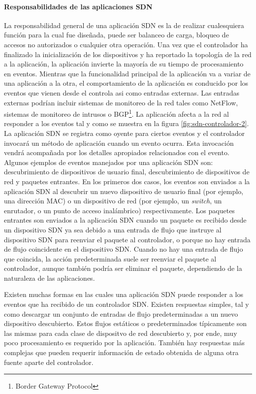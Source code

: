 \documentclass[10pt,journal,compsoc]{IEEEtran}
\begin{document}
\paragraph{Responsabilidades de las aplicaciones SDN}
La responsabilidad general de una aplicación SDN es la de realizar cualesquiera función para la cual fue diseñada, puede ser balanceo de carga, bloqueo de accesos no autorizados o cualquier otra operación. Una vez que el controlador ha finalizado la inicialización de los dispositivos y ha reportado la topología de la red a la aplicación, la aplicación invierte la mayoría de su tiempo de procesamiento en eventos. Mientras que la funcionalidad principal de la aplicación va a variar de una aplicación a la otra, el comportamiento de la aplicación es conducido por los eventos que vienen desde el controla asi como entradas externas. Las entradas externas podrían incluir sistemas de monitoreo de la red tales como NetFlow, sistemas de monitoreo de intrusos o BGP\footnote{Border Gateway Protocol}. La aplicación afecta a la red al responder a los eventos tal y como se muestra en la figura \ref{fig:sdn-controlador-2}. La aplicación SDN se registra como oyente para ciertos eventos y el controlador invocará un método de aplicación cuando un evento ocurra. Esta invocación vendrá acompañada por los detalles apropiados relacionados con el evento. Algunos ejemplos de eventos manejados por una aplicación SDN son: descubrimiento de dispositivos de usuario final, descubrimiento de dispositivos de red y paquetes entrantes. En los primeros dos casos, los eventos son enviados a la aplicación SDN al descubrir un nuevo dispositivo de usuario final (por ejemplo, una dirección MAC) o un dispositivo de red (por ejemplo, un \emph{switch}, un enrutador, o un punto de acceso inalámbrico) respectivamente. Los paquetes entrantes son enviados a la aplicación SDN cuando un paquete es recibido desde un dispositivo SDN ya sea debido a una entrada de flujo que instruye al dispositivo SDN para reenviar el paquete al controlador, o porque no hay entrada de flujo coincidente en el dispositivo SDN. Cuando no hay una entrada de flujo que coincida, la acción predeterminada suele ser reenviar el paquete al controlador, aunque también podría ser eliminar el paquete, dependiendo de la naturaleza de las aplicaciones.

Existen muchas formas en las cuales una aplicación SDN puede responder a los eventos que ha recibido de un controlador SDN. Existen respuestas simples, tal y como descargar un conjunto de entradas de flujo predeterminadas a un nuevo dispositivo descubierto. Estos flujos estáticos o predeterminados típicamente son las mismas para cada clase de dispositvo de red descubierto y, por ende, muy poco procesamiento es requerido por la aplicación. También hay respuestas más complejas que pueden requerir información de estado obtenida de alguna otra fuente aparte del controlador.
\end{document}
